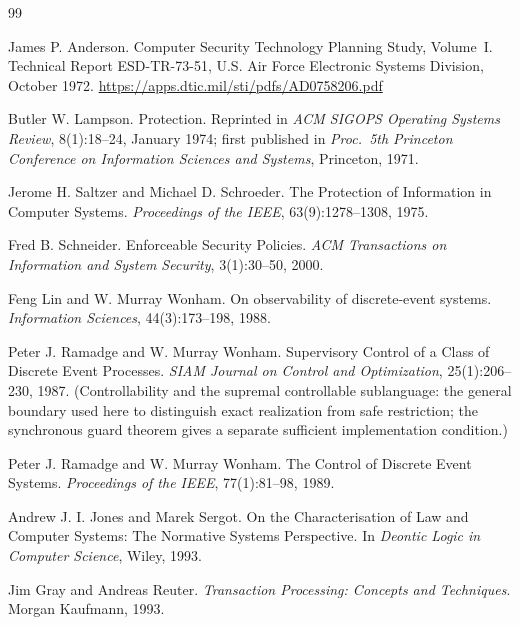 \documentclass[11pt,a4paper]{article}
\theoremstyle{definition}
\theoremstyle{remark}
\begin{document}

\pdprintsolutions
\begin{thebibliography}{99}

James P. Anderson.
\newblock Computer Security Technology Planning Study, Volume~I.
\newblock Technical Report ESD-TR-73-51, U.S. Air Force Electronic Systems Division, October 1972.
\newblock \url{https://apps.dtic.mil/sti/pdfs/AD0758206.pdf}

 Butler W. Lampson. Protection. Reprinted in \emph{ACM SIGOPS Operating
Systems Review}, 8(1):18--24, January 1974; first published in \emph{Proc.\ 5th Princeton
Conference on Information Sciences and Systems}, Princeton, 1971.

Jerome H. Saltzer and Michael D. Schroeder.
\newblock The Protection of Information in Computer Systems.
\newblock \textit{Proceedings of the IEEE}, 63(9):1278--1308, 1975.

Fred B. Schneider.
\newblock Enforceable Security Policies.
\newblock \textit{ACM Transactions on Information and System Security}, 3(1):30--50, 2000.

Feng Lin and W. Murray Wonham.
\newblock On observability of discrete-event systems.
\newblock \textit{Information Sciences}, 44(3):173--198, 1988.

Peter J. Ramadge and W. Murray Wonham.
\newblock Supervisory Control of a Class of Discrete Event Processes.
\newblock \textit{SIAM Journal on Control and Optimization}, 25(1):206--230, 1987.
\newblock (Controllability and the supremal controllable sublanguage: the general
boundary used here to distinguish exact realization from safe restriction;
the synchronous guard theorem gives a separate sufficient implementation condition.)

Peter J. Ramadge and W. Murray Wonham.
\newblock The Control of Discrete Event Systems.
\newblock \textit{Proceedings of the IEEE}, 77(1):81--98, 1989.

Andrew J. I. Jones and Marek Sergot.
\newblock On the Characterisation of Law and Computer Systems: The Normative Systems Perspective.
\newblock In \textit{Deontic Logic in Computer Science}, Wiley, 1993.

Jim Gray and Andreas Reuter.
\newblock \textit{Transaction Processing: Concepts and Techniques}.
\newblock Morgan Kaufmann, 1993.


\end{thebibliography}
\end{document}
